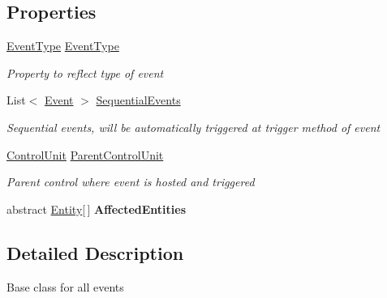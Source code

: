 \subsection*{Properties}
\begin{DoxyCompactItemize}
\item 
\hyperlink{namespace_simulation_core_1_1_h_c_c_m_elements_a669ec0bd71214ac647777c49eb962e13}{Event\+Type} \hyperlink{class_simulation_core_1_1_h_c_c_m_elements_1_1_event_a209d233006a0bd5f72276381c3a4bcb3}{Event\+Type}
\begin{DoxyCompactList}\small\item\em Property to reflect type of event \end{DoxyCompactList}\item 
List$<$ \hyperlink{class_simulation_core_1_1_h_c_c_m_elements_1_1_event}{Event} $>$ \hyperlink{class_simulation_core_1_1_h_c_c_m_elements_1_1_event_a0eca4e693d5a4c68d0cc27ae24e45103}{Sequential\+Events}
\begin{DoxyCompactList}\small\item\em Sequential events, will be automatically triggered at trigger method of event \end{DoxyCompactList}\item 
\hyperlink{class_simulation_core_1_1_h_c_c_m_elements_1_1_control_unit}{Control\+Unit} \hyperlink{class_simulation_core_1_1_h_c_c_m_elements_1_1_event_a82b2a9553b21254fd44aea403764d5a5}{Parent\+Control\+Unit}
\begin{DoxyCompactList}\small\item\em Parent control where event is hosted and triggered \end{DoxyCompactList}\item 
abstract \hyperlink{class_simulation_core_1_1_h_c_c_m_elements_1_1_entity}{Entity}\mbox{[}$\,$\mbox{]} {\bfseries Affected\+Entities}\hypertarget{class_simulation_core_1_1_h_c_c_m_elements_1_1_event_ac58768146d152d2cd1cbeba30d64806e}{}\label{class_simulation_core_1_1_h_c_c_m_elements_1_1_event_ac58768146d152d2cd1cbeba30d64806e}

\end{DoxyCompactItemize}


\subsection{Detailed Description}
Base class for all events 



